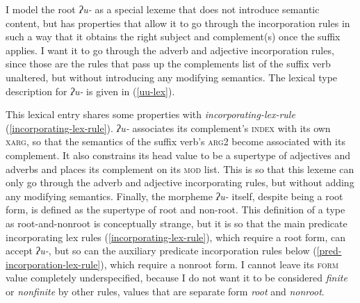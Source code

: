 I model the root \textit{ʔu-} as a special lexeme that does not introduce semantic content, but has properties that allow it to go through the incorporation rules in such a way that it obtains the right subject and complement(s) once the suffix applies. I want it to go through the adverb and adjective incorporation rules, since those are the rules that pass up the complements list of the suffix verb unaltered, but without introducing any modifying semantics. The lexical type description for \textit{ʔu-} is given in (\ref{uu-lex}).

\begin{singlespacing}
\ex \label{uu-lex}
\xe
\end{singlespacing}

This lexical entry shares some properties with \textit{incorporating-lex-rule} (\ref{incorporating-lex-rule}). \textit{ʔu-} associates its complement's \textsc{index} with its own \textsc{xarg}, so that the semantics of the suffix verb's \textsc{arg2} become associated with its complement. It also constrains its head value to be a supertype of adjectives and adverbs and places its complement on its \textsc{mod} list. This is so that this lexeme can only go through the adverb and adjective incorporating rules, but without adding any modifying semantics. Finally, the morpheme \textit{ʔu-} itself, despite being a root form, is defined as the supertype of root and non-root. This definition of a type as root-and-nonroot is conceptually strange, but it is so that the main predicate incorporating lex rules (\ref{incorporating-lex-rule}), which require a root form, can accept \textit{ʔu-}, but so can the auxiliary predicate incorporation rules below (\ref{pred-incorporation-lex-rule}), which require a nonroot form. I cannot leave its \textsc{form} value completely underspecified, because I do not want it to be considered \textit{finite} or \textit{nonfinite} by other rules, values that are separate form \textit{root} and \textit{nonroot}.

